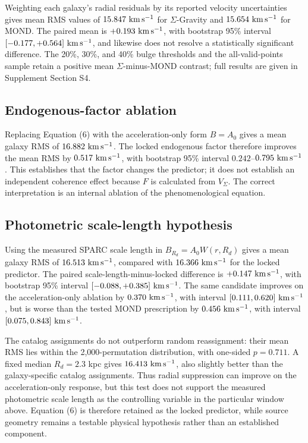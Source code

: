 \documentclass[utf8]{FrontiersinHarvard}
\begin{document}
Weighting each galaxy's radial residuals by its reported velocity uncertainties gives mean RMS values of \(15.847\ {\rm km\,s^{-1}}\) for \(\Sigma\)-Gravity and \(15.654\ {\rm km\,s^{-1}}\) for MOND. The paired mean is \(+0.193\ {\rm km\,s^{-1}}\), with bootstrap 95\% interval \([-0.177,+0.564]\ {\rm km\,s^{-1}}\), and likewise does not resolve a statistically significant difference. The 20\%, 30\%, and 40\% bulge thresholds and the all-valid-points sample retain a positive mean \(\Sigma\)-minus-MOND contrast; full results are given in Supplement Section S4.

\subsection{Endogenous-factor ablation}\label{endogenous-factor-ablation}

Replacing Equation (6) with the acceleration-only form \(B=A_0\) gives a mean galaxy RMS of \(16.882\ {\rm km\,s^{-1}}\). The locked endogenous factor therefore improves the mean RMS by \(0.517\ {\rm km\,s^{-1}}\), with bootstrap 95\% interval \(0.242\)--\(0.795\ {\rm km\,s^{-1}}\). This establishes that the factor changes the predictor; it does not establish an independent coherence effect because \(F\) is calculated from \(V_\Sigma\). The correct interpretation is an internal ablation of the phenomenological equation.

\subsection{Photometric scale-length hypothesis}\label{photometric-scale-length-hypothesis}

Using the measured SPARC scale length in \(B_{R_d}=A_0W(r,R_d)\) gives a mean galaxy RMS of \(16.513\ {\rm km\,s^{-1}}\), compared with \(16.366\ {\rm km\,s^{-1}}\) for the locked predictor. The paired scale-length-minus-locked difference is \(+0.147\ {\rm km\,s^{-1}}\), with bootstrap 95\% interval \([-0.088,+0.385]\ {\rm km\,s^{-1}}\). The same candidate improves on the acceleration-only ablation by \(0.370\ {\rm km\,s^{-1}}\), with interval \([0.111,0.620]\ {\rm km\,s^{-1}}\), but is worse than the tested MOND prescription by \(0.456\ {\rm km\,s^{-1}}\), with interval \([0.075,0.843]\ {\rm km\,s^{-1}}\).

The catalog assignments do not outperform random reassignment: their mean RMS lies within the 2,000-permutation distribution, with one-sided \(p=0.711\). A fixed median \(R_d=2.3\) kpc gives \(16.413\ {\rm km\,s^{-1}}\), also slightly better than the galaxy-specific catalog assignments. Thus radial suppression can improve on the acceleration-only response, but this test does not support the measured photometric scale length as the controlling variable in the particular window above. Equation (6) is therefore retained as the locked predictor, while source geometry remains a testable physical hypothesis rather than an established component.
\end{document}
